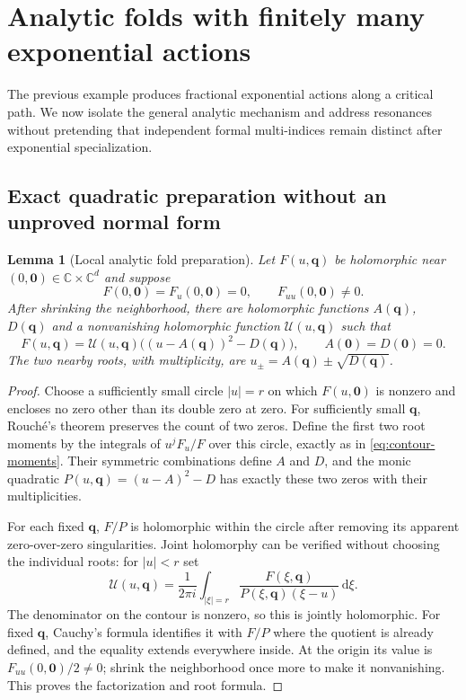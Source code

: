 \documentclass[11pt,a4paper]{article}
\newtheorem{lemma}[theorem]{Lemma}
\theoremstyle{definition}
\theoremstyle{remark}
\newcommand{\C}{\mathbb C}
\newcommand{\dd}{\,\mathrm d}
\begin{document}
\section{Analytic folds with finitely many exponential actions}
\label{sec:actions}

The previous example produces fractional exponential actions along a
critical path. We now isolate the general analytic mechanism and address
resonances without pretending that independent formal multi-indices
remain distinct after exponential specialization.

\subsection{Exact quadratic preparation without an unproved normal form}
\begin{lemma}[Local analytic fold preparation]\label{lem:fold}
Let $F(u,\bm q)$ be holomorphic near $(0,\bm0)\in\C\times\C^d$ and suppose
\begin{equation}\label{eq:fold-hyp}
 F(0,\bm0)=F_u(0,\bm0)=0,\qquad F_{uu}(0,\bm0)\ne0.
\end{equation}
After shrinking the neighborhood, there are holomorphic functions
$A(\bm q)$, $D(\bm q)$ and a nonvanishing holomorphic function
$\mathcal U(u,\bm q)$ such that
\begin{equation}\label{eq:fold-preparation}
 F(u,\bm q)=\mathcal U(u,\bm q)
             \bigl((u-A(\bm q))^2-D(\bm q)\bigr),
 \qquad A(\bm0)=D(\bm0)=0.
\end{equation}
The two nearby roots, with multiplicity, are
$u_\pm=A(\bm q)\pm\sqrt{D(\bm q)}$.
\end{lemma}
\begin{proof}
Choose a sufficiently small circle $|u|=r$ on which $F(u,\bm0)$ is
nonzero and encloses no zero other than its double zero at zero.
For sufficiently small $\bm q$, Rouch\'e's theorem preserves the count
of two zeros. Define the first two root moments by the integrals of
$u^jF_u/F$ over this circle, exactly as in
\eqref{eq:contour-moments}. Their symmetric combinations define
$A$ and $D$, and the monic quadratic
$P(u,\bm q)=(u-A)^2-D$ has exactly these two zeros with their
multiplicities.

For each fixed $\bm q$, $F/P$ is holomorphic within the circle after
removing its apparent zero-over-zero singularities. Joint holomorphy
can be verified without choosing the individual roots: for $|u|<r$ set
\[
 \mathcal U(u,\bm q)=\frac1{2\pi i}\int_{|\xi|=r}
  \frac{F(\xi,\bm q)}{P(\xi,\bm q)(\xi-u)}\dd\xi.
\]
The denominator on the contour is nonzero, so this is jointly holomorphic.
For fixed $\bm q$, Cauchy's formula identifies it with $F/P$ where the
quotient is already defined, and the equality extends everywhere inside.
At the origin its value is $F_{uu}(0,\bm0)/2\ne0$; shrink the neighborhood
once more to make it nonvanishing. This proves the factorization and
root formula.
\end{proof}
\end{document}
